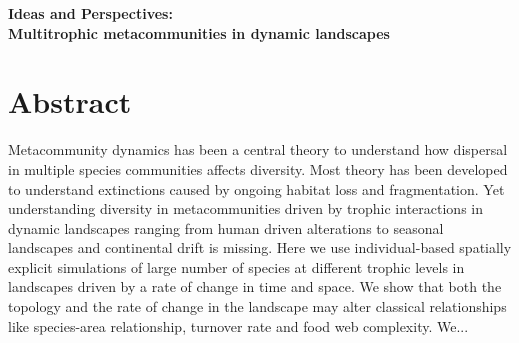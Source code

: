 \documentclass[10pt]{article}
\date{}
\begin{document}
\begin{flushleft}
{\Large
\textbf{Ideas and Perspectives:\\ Multitrophic metacommunities in dynamic landscapes}
}
\end{flushleft}

\section*{Abstract}

Metacommunity dynamics has been a central theory to understand how
dispersal in multiple species communities affects diversity. Most
theory has been developed to understand extinctions caused by ongoing
habitat loss and fragmentation. Yet understanding diversity in
metacommunities driven by trophic interactions in dynamic landscapes
ranging from human driven alterations to seasonal landscapes and
continental drift is missing. Here we use individual-based spatially
explicit simulations of large number of species at different trophic
levels in landscapes driven by a rate of change in time and space. We
show that both the topology and the rate of change in the landscape
may alter classical relationships like species-area relationship,
turnover rate and food web complexity. We...

\end{document}
